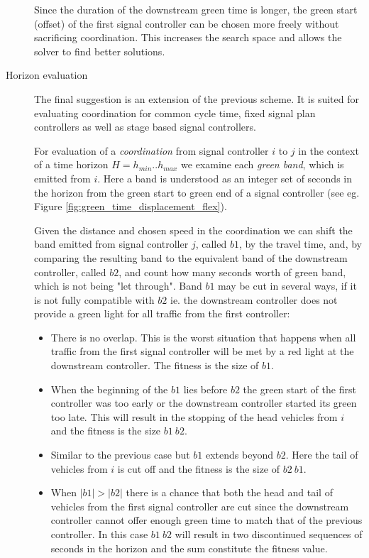 \begin{description}
Since the duration of the downstream green time is longer, the green start (offset) of the first signal controller can be chosen more freely without sacrificing coordination. This increases the search space and allows the solver to find better solutions.

\item[Horizon evaluation]
The final suggestion is an extension of the previous scheme. It is suited for evaluating coordination for common cycle time, fixed signal plan controllers as well as stage based signal controllers.

For evaluation of a \textit{coordination} from signal controller $i$ to $j$ in the context of a time horizon $H = h_{min} .. h_{max}$ we examine each \textit{green band}, which is emitted from $i$. Here a band is understood as an integer set of seconds in the horizon from the green start to green end of a signal controller (see eg. Figure \ref{fig:green_time_displacement_flex}).

Given the distance and chosen speed in the coordination we can shift the band emitted from signal controller $j$, called $b1$, by the travel time, and, by comparing the resulting band to the equivalent band of the downstream controller, called $b2$,  and count how many seconds worth of green band, which is not being "let through". Band $b1$ may be cut in several ways, if it is not fully compatible with $b2$ ie. the downstream controller does not provide a green light for all traffic from the first controller:

\begin{itemize}
\item There is no overlap. This is the worst situation that happens when all traffic from the first signal controller will be met by a red light at the downstream controller. The fitness is the size of $b1$.
\item When the beginning of the $b1$ lies before $b2$ the green start of the first controller was too early or the downstream controller started its green too late. This will result in the stopping of the head vehicles from $i$ and the fitness is the size $b1 \ b2$.
\item Similar to the previous case but $b1$ extends beyond $b2$. Here the tail of vehicles from $i$ is cut off and the fitness is the size of $b2 \ b1$.
\item When $|b1|>|b2|$ there is a chance that both the head and tail of vehicles from the first signal controller are cut since the downstream controller cannot offer enough green time to match that of the previous controller. In this case $b1 \ b2$ will result in two discontinued sequences of seconds in the horizon and the sum constitute the fitness value.
\end{itemize}


\end{description}
